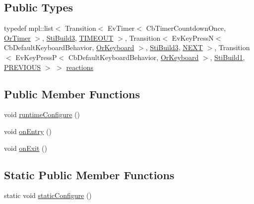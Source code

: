 \subsection*{Public Types}
\begin{DoxyCompactItemize}
\item 
typedef mpl\+::list$<$ Transition$<$ Ev\+Timer$<$ Cb\+Timer\+Countdown\+Once, \hyperlink{classsm__starcraft__ai_1_1OrTimer}{Or\+Timer} $>$, \hyperlink{structsm__starcraft__ai_1_1build__inner__states_1_1StiBuild3}{Sti\+Build3}, \hyperlink{structsm__starcraft__ai_1_1build__inner__states_1_1StiBuild2_1_1TIMEOUT}{T\+I\+M\+E\+O\+UT} $>$, Transition$<$ Ev\+Key\+PressN$<$ Cb\+Default\+Keyboard\+Behavior, \hyperlink{classsm__starcraft__ai_1_1OrKeyboard}{Or\+Keyboard} $>$, \hyperlink{structsm__starcraft__ai_1_1build__inner__states_1_1StiBuild3}{Sti\+Build3}, \hyperlink{structsm__starcraft__ai_1_1build__inner__states_1_1StiBuild2_1_1NEXT}{N\+E\+XT} $>$, Transition$<$ Ev\+Key\+PressP$<$ Cb\+Default\+Keyboard\+Behavior, \hyperlink{classsm__starcraft__ai_1_1OrKeyboard}{Or\+Keyboard} $>$, \hyperlink{structsm__starcraft__ai_1_1build__inner__states_1_1StiBuild1}{Sti\+Build1}, \hyperlink{structsm__starcraft__ai_1_1build__inner__states_1_1StiBuild2_1_1PREVIOUS}{P\+R\+E\+V\+I\+O\+US} $>$ $>$ \hyperlink{structsm__starcraft__ai_1_1build__inner__states_1_1StiBuild2_ab615bc2995682a7a80cdf4d5ddcad22c}{reactions}
\end{DoxyCompactItemize}
\subsection*{Public Member Functions}
\begin{DoxyCompactItemize}
\item 
void \hyperlink{structsm__starcraft__ai_1_1build__inner__states_1_1StiBuild2_a69f6a051fbfd9476762b804fbb06809a}{runtime\+Configure} ()
\item 
void \hyperlink{structsm__starcraft__ai_1_1build__inner__states_1_1StiBuild2_aac67681e26987ca8d4bf57e9e561dae7}{on\+Entry} ()
\item 
void \hyperlink{structsm__starcraft__ai_1_1build__inner__states_1_1StiBuild2_a2b0e97a51cf2a806d5238a54c68cb3f3}{on\+Exit} ()
\end{DoxyCompactItemize}
\subsection*{Static Public Member Functions}
\begin{DoxyCompactItemize}
\item 
static void \hyperlink{structsm__starcraft__ai_1_1build__inner__states_1_1StiBuild2_a811f387766855eeba5679d7943ccdee1}{static\+Configure} ()
\end{DoxyCompactItemize}
